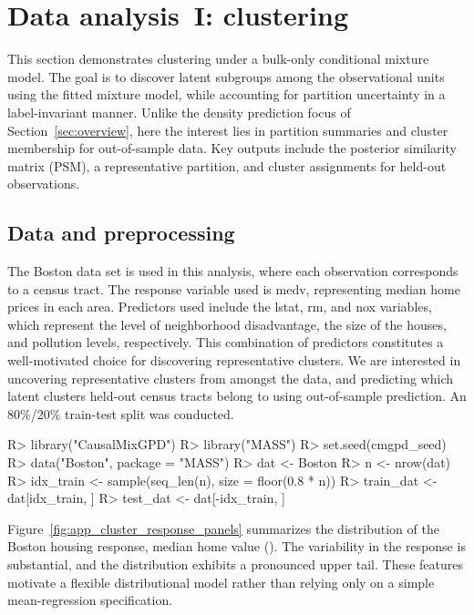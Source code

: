 \documentclass[11pt]{article}\usepackage[]{graphicx}\usepackage[]{xcolor}
\newcommand{\code}[1]{\texttt{\detokenize{#1}}}
\renewenvironment{Schunk}{\vspace{0pt}}{\vspace{-0.1\baselineskip}}
\begin{document}
\section{Data analysis~I: clustering}
\label{sec:app-clustering}

This section demonstrates clustering under a bulk-only conditional mixture model. The goal is to discover latent subgroups among the observational units using the fitted mixture model, while accounting for partition uncertainty in a label-invariant manner. Unlike the density prediction focus of Section~\ref{sec:overview}, here the interest lies in partition summaries and cluster membership for out-of-sample data. Key outputs include the posterior similarity matrix (PSM), a representative partition, and cluster assignments for held-out observations.

\subsection{Data and preprocessing}

The Boston data set is used in this analysis, where each observation corresponds to a census tract. The response variable used is medv, representing median home prices in each area. Predictors used include the lstat, rm, and nox variables, which represent the level of neighborhood disadvantage, the size of the houses, and pollution levels, respectively. This combination of predictors constitutes a well-motivated choice for discovering representative clusters. We are interested in uncovering representative clusters from amongst the data, and predicting which latent clusters held-out census tracts belong to using out-of-sample prediction. An 80\%/20\% train-test split was conducted.

\begin{Schunk}
\begin{Sinput}
R> library("CausalMixGPD")
R> library("MASS")
R> set.seed(cmgpd_seed)
R> data("Boston", package = "MASS")
R> dat <- Boston
R> n <- nrow(dat)
R> idx_train <- sample(seq_len(n), size = floor(0.8 * n))
R> train_dat <- dat[idx_train, ]
R> test_dat <- dat[-idx_train, ]
\end{Sinput}
\end{Schunk}
Figure~\ref{fig:app_cluster_response_panels} summarizes the distribution of the Boston housing response, median home value (\code{medv}). The variability in the response is substantial, and the distribution exhibits a pronounced upper tail. These features motivate a flexible distributional model rather than relying only on a simple mean-regression specification.
\end{document}
